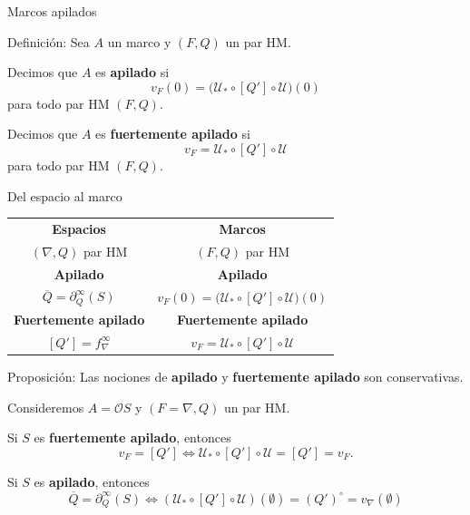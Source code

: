 \documentclass[compress,12pt]{beamer}
\begin{document}
\begin{frame}{Marcos apilados}

\begin{block}{Definición:}
Sea \(A\) un marco y \((F,Q)\) un par HM.

Decimos que \(A\) es \textbf{apilado} si
\[
    \boxed{
    v_F(0)
    =
    \bigl(
        \mathcal{U}_*\circ[Q']\circ\mathcal{U}
    \bigr)(0)
    }
\]
para todo par HM \((F,Q)\).

\vspace{0.5cm}

Decimos que \(A\) es \textbf{fuertemente apilado} si
\[
    \boxed{
    v_F
    =
    \mathcal{U}_*\circ[Q']\circ\mathcal{U}
    }
\]
para todo par HM \((F,Q)\).
\end{block}
\end{frame}

\begin{frame}{Del espacio al marco}

\begin{center}
\begin{tabular}{c@{\qquad\qquad}c}
    \textbf{Espacios} & \textbf{Marcos} \\[0.3cm]

    \((\nabla,Q)\) par HM
    &
    \((F,Q)\) par HM
    \\[0.5cm]

    \textbf{Apilado}
    &
    \textbf{Apilado}
    \\[0.2cm]

    \(
        \overline{Q}=\partial_Q^\infty(S)
    \)
    &
    \(
        v_F(0)
        =
        \bigl(
        \mathcal{U}_*\circ[Q']\circ\mathcal{U}
        \bigr)(0)
    \)
    \\[0.7cm]

    \textbf{Fuertemente apilado}
    &
    \textbf{Fuertemente apilado}
    \\[0.2cm]

    \(
        [Q']=f_\nabla^\infty
    \)
    &
    \(
        v_F
        =
        \mathcal{U}_*\circ[Q']\circ\mathcal{U}
    \)
\end{tabular}
\end{center}

\end{frame}

\begin{frame}
\begin{block}{Proposición:}
Las nociones de \textbf{apilado} y
\textbf{fuertemente apilado} son conservativas.
\end{block}

Consideremos \(A=\mathcal{O}S\) y \((F=\nabla,Q)\) un par HM.

\vspace{0.2cm}

Si \(S\) es \textbf{fuertemente apilado}, entonces
\[
    v_F=[Q']
\iff    \mathcal{U}_*\circ[Q']\circ\mathcal{U}
    =[Q']=v_F.
\]

Si \(S\) es \textbf{apilado}, entonces
\[
    \overline{Q}=\partial_Q^\infty(S)\iff  (\mathcal{U}_*\circ [Q']\circ \mathcal{U})(\emptyset)=(Q')^\circ=v_\nabla(\emptyset) 
\]
\end{frame}
\end{document}
